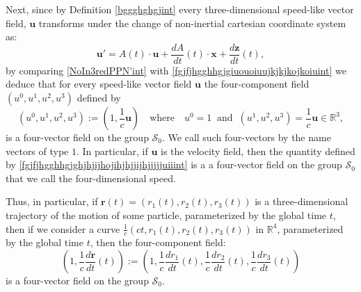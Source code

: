 \documentclass{article}
\theoremstyle{definition}
\theoremstyle{remark}
\renewcommand{\vec}[1]{\mathbf{#1}}
\newcommand{\er}{\eqref}
\newcommand{\er}{\eqref}
\begin{document}
Next, since by Definition \ref{bggghghgjint} every three-dimensional
speed-like vector field, $\vec u$ transforms under the change of
non-inertial cartesian coordinate system as:
\begin{equation}
\label{NoIn3redPPN'int}\vec u'=A(t)\cdot \vec
u+\frac{dA}{dt}\left(t\right)\cdot\vec x+\frac{d \vec
z}{dt}\left(t\right),
\end{equation}
by comparing \er{NoIn3redPPN'int} with
\er{fgjfjhgghhgjgiuouoiuujkjkjkojkoiuint} we deduce that for every
speed-like vector field $\vec u$ the four-component field
$(u^0,u^1,u^2,u^3)$ defined by
\begin{equation}\label{fgjfjhgghhgjghjhjijhojihjhjjijhjjjjjuiiint}
(u^0,u^1,u^2,u^3):=\left(1,\frac{1}{c}\vec
u\right)\quad\text{where}\quad
u^0=1\;\;\text{and}\;\;(u^1,u^2,u^3)=\frac{1}{c}\vec
u\in\mathbb{R}^3,
\end{equation}
is a four-vector field on the group $\mathcal{S}_0$. We call such
four-vectors by the name vectors of type $1$. In particular, if
$\vec u$ is the velocity field, then the quantity defined by
\er{fgjfjhgghhgjghjhjijhojihjhjjijhjjjjjuiiint} is a a four-vector
field on the group $\mathcal{S}_0$ that we call the four-dimensional
speed.
%
%
%
\begin{comment}
Regarding the field of velocity $\vec u$ we also can give a
different argumentation that the four-component field
$(u^0,u^1,u^2,u^3)$ defined by
\er{fgjfjhgghhgjghjhjijhojihjhjjijhjjjjjuiiint} is a four-vector
field on the group $\mathcal{S}_0$: indeed it is well known from
Tensor Analysys that if $\left(x^0(s),x^1(s),x^2(s),x^3(s)\right)$
is a curve in $\mathbb{R}^4$, parameterized by some scalar parameter
$s$, then the four-component field
$\left(\frac{dx^0}{ds}(s),\frac{dx^1}{ds}(s),\frac{dx^2}{ds}(s),\frac{dx^3}{ds}(s)\right)$
is a four-vector field on an arbitrary group $\mathcal{S}$ and, in
particular, on the group $\mathcal{S}_0$.
\end{comment}
%
%
%
Thus, in particular, if $\vec
r(t)=\left(r_1(t),r_2(t),r_3(t)\right)$ is a three-dimensional
trajectory of the motion of some particle, parameterized by the
global time $t$, then if we consider a curve
$\frac{1}{c}\left(ct,r_1(t),r_2(t),r_3(t)\right)$ in $\mathbb{R}^4$,
parameterized by the global time $t$, then the four-component field:
\begin{equation}\label{fgjfjhgghhgjghjhjijhojihjhjjijhjjjjjuiijhjhhint}
\left(1,\frac{1}{c}\frac{d\vec r}{dt}(t)\right):=
\left(1,\frac{1}{c}\frac{dr_1}{dt}(t),\frac{1}{c}\frac{dr_2}{dt}(t),\frac{1}{c}\frac{dr_3}{dt}(t)\right)
\end{equation}
is a four-vector field on the group $\mathcal{S}_0$.
\end{document}
